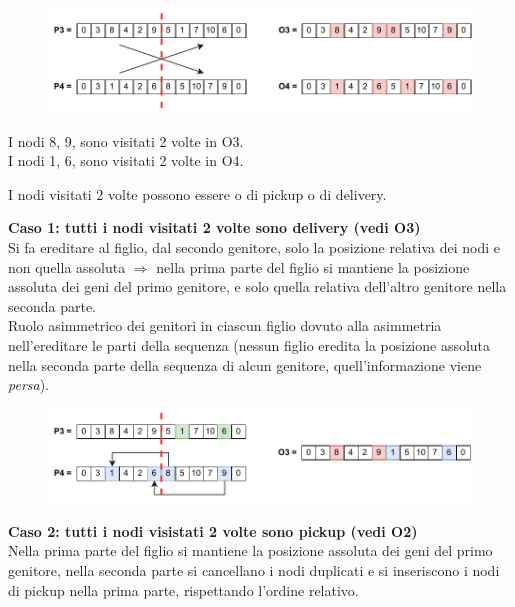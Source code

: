 \documentclass[9pt]{beamer}
\begin{document}
\begin{frame}[allowframebreaks]{\subsecname}
\framebreak

      	\begin{figure}[h]
	\centering
	\includegraphics[width=\textwidth]
	{../images/crossover-1b}
	\end{figure}

	I nodi 8, 9, sono visitati 2 volte in O3. \\
	I nodi 1, 6, sono visitati 2 volte in O4.

\framebreak

	I nodi visitati 2 volte possono essere o di pickup o di delivery.

	\textbf{Caso 1: tutti i nodi visitati 2 volte sono delivery (vedi O3)} \\
	Si fa ereditare al figlio, dal secondo genitore, solo la posizione relativa dei nodi e non quella assoluta $\Rightarrow$ nella prima parte del figlio si mantiene la posizione assoluta dei geni del primo genitore, e solo quella relativa dell’altro genitore nella seconda parte. \\
Ruolo asimmetrico dei genitori in ciascun figlio dovuto alla asimmetria nell’ereditare le parti della sequenza (nessun figlio eredita la posizione assoluta nella seconda parte della sequenza di alcun genitore, quell’informazione viene \emph{persa}).

      	\begin{figure}[h]
	\centering
	\includegraphics[width=\textwidth]
	{../images/crossover-1c}
	\end{figure}

\framebreak

	\textbf{Caso 2: tutti i nodi visistati 2 volte sono pickup (vedi O2)} \\
	Nella prima parte del figlio si mantiene la posizione assoluta dei geni del primo genitore, nella seconda parte si cancellano i nodi duplicati e si inseriscono i nodi di pickup nella prima parte, rispettando l’ordine relativo.


\end{frame}
\end{document}
